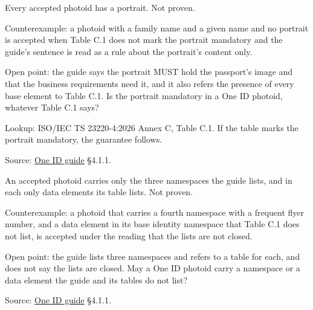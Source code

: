 \begin{theorem}
  \label{thm:photoid-has-portrait}
  Every accepted photoid has a portrait.  Not proven.

  Counterexample: a photoid with a family name and a given name and no
  portrait is accepted when Table C.1 does not mark the portrait mandatory and the
  guide's sentence is read as a rule about the portrait's content only.

  Open point: the guide says the portrait MUST hold the passport's image and
  that the business requirements need it, and it also refers the presence of
  every base element to Table C.1.  Is the portrait mandatory in a One ID
  photoid, whatever Table C.1 says?

  Lookup: ISO/IEC TS 23220-4:2026 Annex C, Table C.1.  If the table marks the
  portrait mandatory, the guarantee follows.

  Source: \href{https://standards.atlassian.net/wiki/spaces/OneID/pages/2947416082/Technical+Implementation+Guide}{One ID guide} §4.1.1.
\end{theorem}

\begin{theorem}
  \label{thm:photoid-only-listed}
  An accepted photoid carries only the three namespaces the guide lists, and
  in each only data elements its table lists.  Not proven.

  Counterexample: a photoid that carries a fourth namespace with a frequent
  flyer number, and a data element in its base identity namespace that Table
  C.1 does not list, is accepted under the reading that the lists are not
  closed.

  Open point: the guide lists three namespaces and refers to a table for
  each, and does not say the lists are closed.  May a One ID photoid carry a
  namespace or a data element the guide and its tables do not list?

  Source: \href{https://standards.atlassian.net/wiki/spaces/OneID/pages/2947416082/Technical+Implementation+Guide}{One ID guide} §4.1.1.
\end{theorem}

